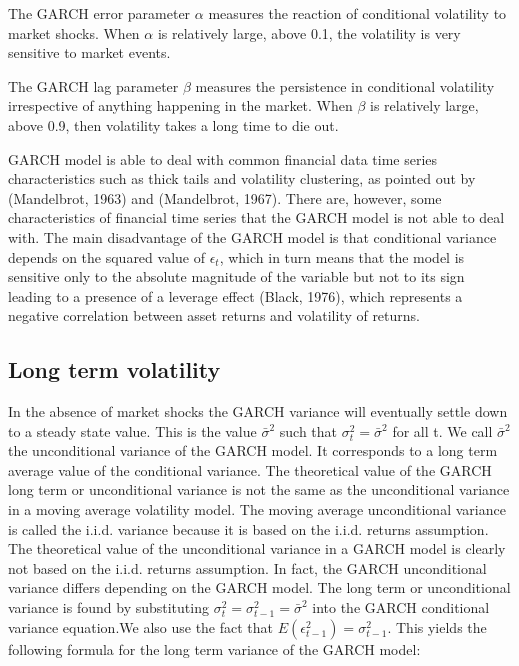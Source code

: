 The GARCH error parameter $\alpha$ measures the reaction of conditional volatility to market shocks. When $\alpha$ is relatively large, above 0.1, the volatility is very sensitive to market events.

The GARCH lag parameter $\beta$ measures the persistence in conditional volatility irrespective of anything happening in the market. When $\beta$ is relatively large, above 0.9, then volatility takes a long time to die out.

GARCH model is able to deal with common financial data time series characteristics such as thick tails and volatility clustering, as pointed out by (Mandelbrot, 1963) and (Mandelbrot, 1967). There are, however, some characteristics of financial time series that the GARCH model is not able to deal with. The main disadvantage of the GARCH model is that conditional variance depends on the squared value of $\epsilon_t$, which in turn means that the model is sensitive only to the absolute magnitude of the variable but not to its sign leading to a presence of a leverage effect (Black, 1976), which represents a negative
correlation between asset returns and volatility of returns.

\subsection*{Long term volatility}

In the absence of market shocks the GARCH variance will eventually settle down to a steady state value. This is the value $\bar{\sigma}^2$ such that ${\sigma_t^2} = \bar{\sigma}^2$ for all t. We call $\bar{\sigma}^2$ the unconditional variance of the GARCH model. It corresponds to a long term average value of the conditional variance. The theoretical value of the GARCH long term or unconditional variance is not the same as the unconditional variance in a moving average volatility model. The moving average unconditional variance is called the i.i.d. variance because it is based on the i.i.d. returns assumption. The theoretical value of the unconditional variance in a GARCH model is clearly not based on the i.i.d. returns assumption. In fact, the GARCH unconditional variance differs depending on the GARCH model. The long term or unconditional variance is found by substituting ${\sigma_t^2} = {\sigma_{t-1}^2} = \bar{\sigma}^2$ into the GARCH conditional variance equation.We also use the fact that $E(\epsilon_{t-1}^2)=\sigma_{t-1}^2$. This yields the following formula for the long term variance of the GARCH model:

